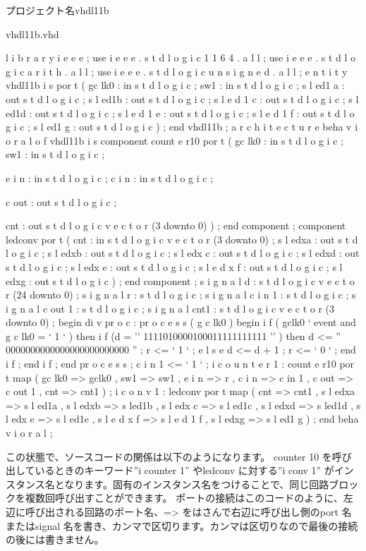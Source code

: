 \documentclass[letterpaper,10pt,dvipdfmx]{sphinxmanual}
\begin{document}
プロジェクト名vhdl11b

vhdl11b.vhd

l i b r a r y i e e e ;
use i e e e . s t d l o g i c 1 1 6 4 . a l l ;
use i e e e . s t d l o g i c a r i t h . a l l ;
use i e e e . s t d l o g i c u n s i g n e d . a l l ;
e n t i t y vhdl11b i s
por t (
gc lk0 : in s t d l o g i c ;
sw1 : in s t d l o g i c ;
s l ed1 a : out s t d l o g i c ;
s l ed1b : out s t d l o g i c ;
s l e d 1 c : out s t d l o g i c ;
s l ed1d : out s t d l o g i c ;
s l e d 1 e : out s t d l o g i c ;
s l e d 1 f : out s t d l o g i c ;
s l ed1 g : out s t d l o g i c
) ;
end vhdl11b ;
a r c h i t e c t u r e beha v i o r a l o f vhdl11b i s
component count e r10
por t (
gc lk0 : in s t d l o g i c ;
sw1 : in s t d l o g i c ;

e i n : in s t d l o g i c ;
c i n : in s t d l o g i c ;

c out : out s t d l o g i c ;

cnt : out s t d l o g i c v e c t o r (3 downto 0)
) ;
end component ;
component ledconv
por t (
cnt : in s t d l o g i c v e c t o r (3 downto 0) ;
s l edxa : out s t d l o g i c ;
s l edxb : out s t d l o g i c ;
s l edx c : out s t d l o g i c ;
s l edxd : out s t d l o g i c ;
s l edx e : out s t d l o g i c ;
s l e d x f : out s t d l o g i c ;
s l edxg : out s t d l o g i c
) ;
end component ;
s i g n a l d : s t d l o g i c v e c t o r (24 downto 0) ;
s i g n a l r : s t d l o g i c ;
s i g n a l c i n 1 : s t d l o g i c ;
s i g n a l c out 1 : s t d l o g i c ;
s i g n a l cnt1 : s t d l o g i c v e c t o r (3 downto 0) ;
begin
di v pr o c : pr o c e s s ( g c lk0 )
begin
i f ( gclk0 ` event and g c lk0 = ` 1 ` ) then
i f (d = '' 1111010000100011111111111 '' ) then
d \textless{}= '' 0000000000000000000000000 '' ;
r \textless{}= ` 1 ` ;
e l s e
d \textless{}= d + 1 ;
r \textless{}= ` 0 ` ;
end i f ;
end i f ;
end pr o c e s s ;
c i n 1 \textless{}= ` 1 ` ;
i c o u n t e r 1 : count e r10
por t map (
gc lk0 =\textgreater{} gclk0 ,
sw1 =\textgreater{} sw1 ,
e i n =\textgreater{} r ,
c i n =\textgreater{} c in 1 ,
c out =\textgreater{} c out 1 ,
cnt =\textgreater{} cnt1
) ;
i c o n v 1 : ledconv
por t map (
cnt =\textgreater{} cnt1 ,
s l edxa =\textgreater{} s l ed1a ,
s l edxb =\textgreater{} s led1b ,
s l edx c =\textgreater{} s l ed1c ,
s l edxd =\textgreater{} s led1d ,
s l edx e =\textgreater{} s l ed1e ,
s l e d x f =\textgreater{} s l e d 1 f ,
s l edxg =\textgreater{} s l ed1 g
) ;
end beha v i o r a l ;

この状態で、ソースコードの関係は以下のようになります。
counter 10 を呼び出しているときのキーワード''i counter 1'' やledconv に対する''i conv 1'' がインスタンス名となります。固有のインスタンス名をつけることで、同じ回路ブロックを複数回呼び出すことができます。
ポートの接続はこのコードのように、左辺に呼び出される回路のポート名、=\textgreater{} をはさんで右辺に呼び出し側のport 名またはsignal 名を書き、カンマで区切ります。カンマは区切りなので最後の接続の後には書きません。
\end{document}
